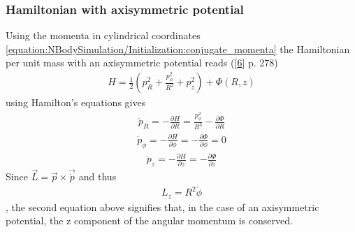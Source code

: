 \documentclass[letterpaper,10pt,english]{sphinxmanual}
\begin{document}
				\subsubsection{Hamiltonian with axisymmetric potential}
					\label{\detokenize{NBodySimulation/Initialization:hamiltonian-with-axisymmetric-potential}}
					\sphinxAtStartPar
					Using the momenta in cylindrical coordinates \eqref{equation:NBodySimulation/Initialization:conjugate_momenta} the Hamiltonian per unit mass with an axisymmetric potential reads ({[}\hyperlink{cite.NBodySimulation/Appendix:id17}{6}{]} p. 278)
					\begin{equation}\label{equation:NBodySimulation/Initialization:hamilton_1}
					\begin{split}H = \frac{1}{2}\left( p_{R}^2+\frac{p_\phi^2}{R^2}+p_z^2 \right)+\Phi\left(R,z\right)\end{split}
					\end{equation}
					\sphinxAtStartPar
					using Hamilton’s equations gives
					\begin{equation}\label{equation:NBodySimulation/Initialization:hamilton_2_1}
					\begin{split}\dot{p}_{R} = -\frac{\partial H}{\partial R} = \frac{p_\phi^2}{R^3}-\frac{\partial \Phi }{\partial R}\end{split}
					\end{equation}\begin{equation}\label{equation:NBodySimulation/Initialization:hamilton_2_2}
					\begin{split}\dot{p}_{\phi} = -\frac{\partial H}{\partial \phi} = -\frac{\partial \Phi }{\partial \phi} = 0\end{split}
					\end{equation}\begin{equation}\label{equation:NBodySimulation/Initialization:hamilton_2_3}
					\begin{split}\dot{p}_{z} = -\frac{\partial H}{\partial z} = -\frac{\partial \Phi }{\partial z}\end{split}
					\end{equation}
					\sphinxAtStartPar
					Since \(\vec{L} = \vec{p} \times \vec{\dot{p}}\) and thus
					\begin{equation}\label{equation:NBodySimulation/Initialization:angular_momentum}
					\begin{split}L_z = R^2\dot{\phi}\end{split}
					\end{equation}
					\sphinxAtStartPar
					, the second equation above signifies that, in the case of an axisymmetric potential, the z component of the angular momentum is conserved.
				
\end{document}

